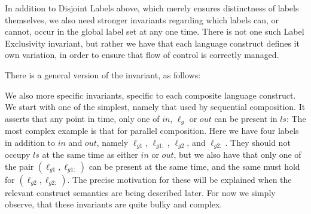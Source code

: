 In addition to Disjoint Labels above,
which merely ensures distinctness of labels themselves,
we also need stronger invariants regarding which labels can, or cannot,
occur in the global label set at any one time.
There is not one such Label Exclusivity invariant,
but rather we have that each language construct defines it own
variation, in order to ensure that flow of control is correctly managed.

There is a general version of the invariant, as follows:

We also more specific invariants, specific to each composite language construct.
We start with one of the simplest,
namely that used by sequential composition.
It asserts that any point in time,
only one of $in$, $\ell_g$ or $out$ can be present in $ls$:
The most complex example is that for parallel composition.
Here we have four labels in addition to $in$ and $out$,
namely $\ell_{g1}$, $\ell_{g1:}$, $\ell_{g2}$, and $\ell_{g2:}$.
They should not occupy $ls$ at the same time as either $in $ or $out$,
but we also have that only one of the pair $(\ell_{g1},\ell_{g1:})$
can be present at the same time,
and the same must hold  for $(\ell_{g2},\ell_{g2:})$.
The precise motivation for these will be explained when the relevant
construct semantics are being described later.
For now we simply observe,
that these invariants are quite bulky and complex.



